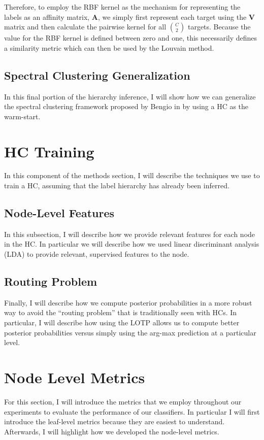 \documentclass[../thesis.tex]{subfiles}
\begin{document}
Therefore, to employ the RBF kernel as the mechanism for representing the labels as an affinity matrix, $\mathbf{A}$, we simply first represent each target using the $\mathbf{V}$ matrix and then calculate the pairwise kernel for all $\binom{C}{2}$ targets. Because the value for the RBF kernel is defined between zero and one, this necessarily defines a similarity metric which can then be used by the Louvain method.

\subsection{Spectral Clustering Generalization}
In this final portion of the hierarchy inference, I will show how we can generalize the spectral clustering framework proposed by Bengio in \cite{bengio2010label} by using a HC as the warm-start.

\section{HC Training}
In this component of the methods section, I will describe the techniques we use to train a HC, assuming that the label hierarchy has already been inferred.

\subsection{Node-Level Features}
In this subsection, I will describe how we provide relevant features for each node in the HC. In particular we will describe how we used linear discriminant analysis (LDA) to provide relevant, supervised features to the node.

\subsection{Routing Problem}
Finally, I will describe how we compute posterior probabilities in a more robust way to avoid the ``routing problem'' that is traditionally seen with HCs. In particular, I will describe how using the LOTP allows us to compute better posterior probabilities versus simply using the arg-max prediction at a particular level. 

\section{Node Level Metrics}
For this section, I will introduce the metrics that we employ throughout our experiments to evaluate the performance of our classifiers. In particular I will first introduce the leaf-level metrics because they are easiest to understand. Afterwards, I will highlight how we developed the node-level metrics.
\end{document}
